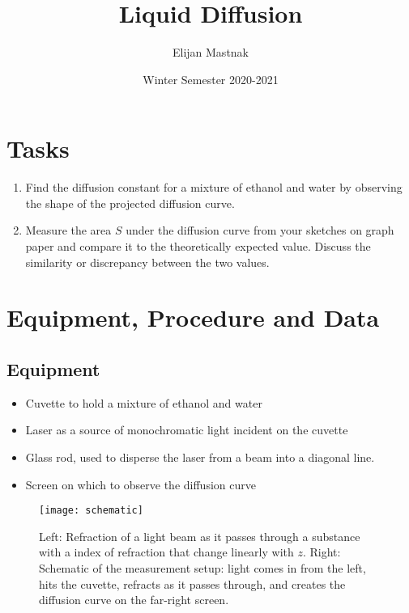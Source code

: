 \documentclass[11pt, a4paper]{article}
\begin{document}
\title{Liquid Diffusion}
\author{Elijan Mastnak}
\date{Winter Semester 2020-2021}
\maketitle
\tableofcontents
		

\section{Tasks}
\begin{enumerate}
	\item Find the diffusion constant for a mixture of ethanol and water by observing the shape of the projected diffusion curve.
	
	\item Measure the area $ S $ under the diffusion curve from your sketches on graph paper and compare it to the theoretically expected value. Discuss the similarity or discrepancy between the two values. 

\end{enumerate}

\section{Equipment, Procedure and Data}

\subsection{Equipment}
\begin{itemize}

	\item Cuvette to hold a mixture of ethanol and water
	
	\item Laser as a source of monochromatic light incident on the cuvette
	
	\item Glass rod, used to disperse the laser from a beam into a diagonal line.
	
	\item Screen on which to observe the diffusion curve
\end{itemize}

\begin{figure}[htb!]
\texttt{[image: schematic]}
\caption{Left: Refraction of a light beam as it passes through a substance with a index of refraction that change linearly with $ z $. Right: Schematic of the measurement setup: light comes in from the left, hits the cuvette, refracts as it passes through, and creates the diffusion curve on the far-right screen.}
\label{diftek:fig:schematic}
\end{figure}
\end{document}

